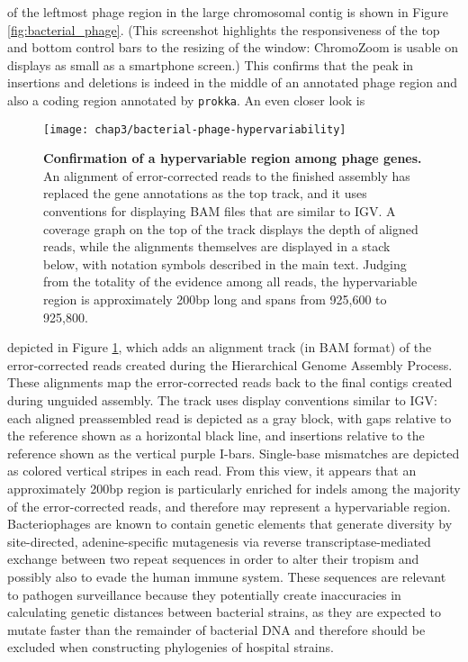  of the leftmost phage region in the large chromosomal contig is shown in Figure \ref{fig:bacterial_phage}. (This screenshot highlights the responsiveness of the top and bottom control bars to the resizing of the window: ChromoZoom is usable on displays as small as a smartphone screen.) This confirms that the peak in insertions and deletions is indeed in the middle of an annotated phage region and also a coding region annotated by \texttt{prokka}. An even closer look is
\begin{figure}
  \centering
  \texttt{[image: chap3/bacterial-phage-hypervariability]}               
  \caption[Confirmation of a hypervariable region among phage genes]{\textbf{Confirmation of a hypervariable region among phage genes.} An alignment of error-corrected reads to the finished assembly has replaced the gene annotations as the top track, and it uses conventions for displaying BAM files that are similar to IGV. A coverage graph on the top of the track displays the depth of aligned reads, while the alignments themselves are displayed in a stack below, with notation symbols described in the main text. Judging from the totality of the evidence among all reads, the hypervariable region is approximately 200bp long and spans from 925,600 to 925,800.}
  \label{fig:bacterial_phage_variability}
\end{figure}
depicted in Figure \ref{fig:bacterial_phage_variability}, which adds an alignment track (in BAM format) of the error-corrected reads created during the Hierarchical Genome Assembly Process. These alignments map the error-corrected reads back to the final contigs created during unguided assembly. The track uses display conventions similar to IGV:\autocite{Thorvaldsdottir2013} each aligned preassembled read is depicted as a gray block, with gaps relative to the reference shown as a horizontal black line, and insertions relative to the reference shown as the vertical purple I-bars. Single-base mismatches are depicted as colored vertical stripes in each read. From this view, it appears that an approximately 200bp region is particularly enriched for indels among the majority of the error-corrected reads, and therefore may represent a hypervariable region. Bacteriophages are known to contain genetic elements that generate diversity by site-directed, adenine-specific mutagenesis via reverse transcriptase-mediated exchange between two repeat sequences in order to alter their tropism and possibly also to evade the human immune system.\autocite{Liu2004,Minot2012} These sequences are relevant to pathogen surveillance because they potentially create inaccuracies in calculating genetic distances between bacterial strains, as they are expected to mutate faster than the remainder of bacterial DNA and therefore should be excluded when constructing phylogenies of hospital strains.

